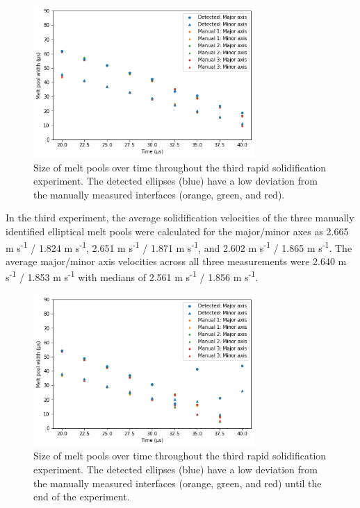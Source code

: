 \begin{figure}[ht]
    \centering
    \includegraphics[width=0.75\textwidth]{figures/04/16-detected-vs-manual-04.png}
    \caption{
        \small{}
        Size of melt pools over time throughout the third rapid
        solidification experiment. The detected ellipses (blue) have a
        low deviation from the manually measured interfaces
        (orange, green, and red).
    }
    \label{fig/detected-dtem-2}
\end{figure}

In the third experiment, the average solidification velocities of the
three manually identified elliptical melt pools were calculated for the
major/minor axes as
2.665 m s\textsuperscript{-1} / 1.824 m s\textsuperscript{-1},
2.651 m s\textsuperscript{-1} / 1.871 m s\textsuperscript{-1}, and
2.602 m s\textsuperscript{-1} / 1.865 m s\textsuperscript{-1}. The
average major/minor axis velocities across all three measurements were
2.640 m s\textsuperscript{-1} / 1.853 m s\textsuperscript{-1} with medians
of 2.561 m s\textsuperscript{-1} / 1.856 m s\textsuperscript{-1}.

\begin{figure}[ht]
    \centering
    \includegraphics[width=0.75\textwidth]{figures/04/17-detected-vs-manual-09.png}
    \caption{
        \small{}
        Size of melt pools over time throughout the third rapid
        solidification experiment. The detected ellipses (blue) have a
        low deviation from the manually measured interfaces
        (orange, green, and red) until the end of the experiment.
    }
    \label{fig/detected-dtem-3}
\end{figure}

